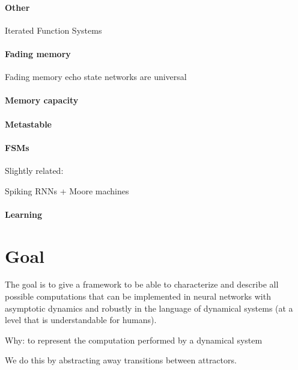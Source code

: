 \documentclass{scrartcl}
\theoremstyle{definition}
\theoremstyle{remark}
\begin{document}
\paragraph{Other}
Iterated Function Systems \citep{kalinke1998computation}



\paragraph{Fading memory}
Fading memory echo state networks are universal \citep{gonon2021fading}

\citep{ortega2024fading}


\paragraph{Memory capacity}
\citep{ballarin2023memory}


\paragraph{Metastable}
\citep{recanatesi2022metastable}

\paragraph{FSMs}
\citep{cleeremans1989finite}


\citep{casey1996}
Slightly related: 
\citep{cotteret2024vector}
\citep{oliva2019}

Spiking RNNs + Moore machines \citep{tino2006learning}


\paragraph{Learning}
\citep{hardt2018}


\section*{Goal}
The goal is to give a framework to be able to characterize and describe all possible computations that can be implemented in neural networks with asymptotic dynamics and robustly in the language of dynamical systems (at a level that is understandable for humans).

Why: to represent the computation performed by a dynamical system 

We do this by abstracting away transitions between attractors.
\end{document}
